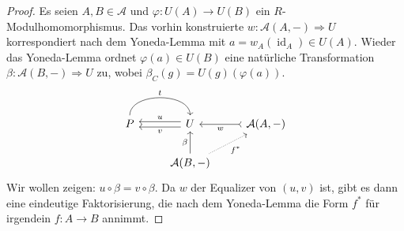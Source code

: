 \documentclass[a4paper, parskip=half]{scrartcl}
\theoremstyle{marginbreak}
\theoremstyle{nonumberplain}
\newtheorem{proof}{Beweis.}
\newcommand\cat\mathcal
\newcommand{\n}{\pgfmatrixnextcell}
\newcommand\nat\Rightarrow
\DeclareMathOperator{\id}{id}
\begin{document}
{\begin{proof}
			Es seien $A, B\in\cat{A}$ und $\varphi\colon U(A)\to U(B)$ ein
			$R$-Modulhomomorphismus. Das vorhin konstruierte $w\colon \cat{A}(A,{-})\nat U$
			korrespondiert nach dem Yoneda-Lemma mit $a = w_A(\id_A)\in U(A)$.
			Wieder das Yoneda-Lemma ordnet $\varphi(a)\in U(B)$ eine natürliche
			Transformation $\beta\colon\cat{A}(B,{-})\nat U$ zu, wobei
			$\beta_C(g) = U(g)(\varphi(a))$.
			\[
				\begin{tikzcd}
					P
						\ar[bend left=90]{r}{t} \n
					U
						\ar[shift right,']{l}{u}
						\ar[shift left]{l}{v} \n
					\cat{A}(A,{-})
						\ar[tail]{l}{w} \\ \n
					\cat{A}(B,{-})
						\ar{u}{\beta}
						\ar[densely dotted, ']{ru}{f^*}
				\end{tikzcd}
			\]
			Wir wollen zeigen: $u\circ\beta=v\circ\beta$. Da $w$ der Equalizer
			von $(u, v)$ ist, gibt es dann eine eindeutige Faktorisierung, die nach
			dem Yoneda-Lemma die Form $f^*$ für irgendein $f\colon A\to B$ annimmt.


\end{proof}}
\end{document}

